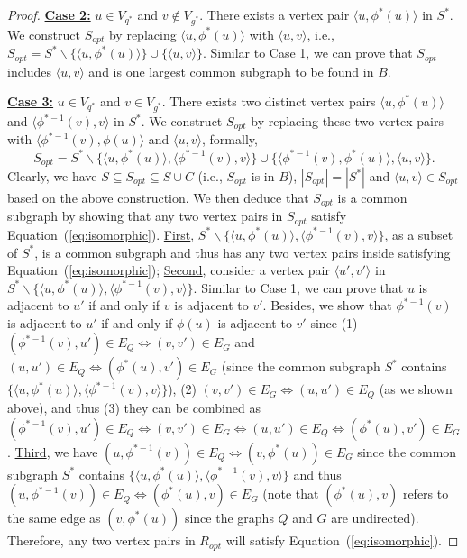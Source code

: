 \begin{proof}
    \smallskip
    \noindent\underline{\textbf{Case 2:}} $u\in V_{q^*}$ and $v\notin V_{g^*}$. There exists a vertex pair $\langle u,\phi^*(u) \rangle$ in $S^*$. We construct $S_{opt}$ by replacing $\langle u,\phi^*(u) \rangle$ with $\langle u,v \rangle$, i.e., $S_{opt}=S^*\backslash \{\langle u,\phi^*(u) \rangle\}\cup\{\langle u,v \rangle\}$. Similar to Case 1, we can prove that $S_{opt}$ includes $\langle u,v \rangle$ and is one largest common subgraph to be found in $B$. 

    \smallskip
    \noindent\underline{\textbf{Case 3:}} $u\in V_{q^*}$ and $v\in V_{g^*}$. There exists two distinct vertex pairs $\langle u,\phi^*(u) \rangle$ and $\langle \phi^{*-1}(v),v \rangle$ in $S^*$. We construct $S_{opt}$ by replacing these two vertex pairs with $\langle \phi^{*-1}(v),\phi(u) \rangle$ and $\langle u,v \rangle$, formally,
    \begin{equation}
        S_{opt}\!\!=\!\!S^*\backslash\{\langle u,\phi^*(u) \rangle,\!\langle\phi^{*-1}(v),v \rangle\}\!\cup\!\{\langle \phi^{*-1}(v),\phi^*(u) \rangle,\!\langle u,v \rangle\}.
    \end{equation}
    Clearly, we have $S\subseteq S_{opt}\subseteq S\cup C$ (i.e., $S_{opt}$ is in $B$), $|S_{opt}|=|S^*|$ and $\langle u,v \rangle\in S_{opt}$ based on the above construction. We then deduce that $S_{opt}$ is a common subgraph  by showing that any two vertex pairs in $S_{opt}$ satisfy Equation~(\ref{eq:isomorphic}).
    \underline{First}, $S^*\backslash\{\langle u,\phi^*(u) \rangle,\langle \phi^{*-1}(v),v\rangle\}$, as a subset of $S^*$, is a common subgraph and thus has any two vertex pairs inside satisfying Equation~(\ref{eq:isomorphic});
    \underline{Second}, consider a vertex pair $\langle u',v' \rangle$ in $S^*\backslash\{\langle u,\phi^*(u) \rangle,\langle \phi^{*-1}(v),v\rangle\}$. Similar to Case 1, we can prove that $u$ is adjacent to $u'$ if and only if $v$ is adjacent to $v'$. Besides, we show that $\phi^{*-1}(v)$ is adjacent to $u'$ if and only if $\phi(u)$ is adjacent to $v'$ since (1) $(\phi^{*-1}(v),u')\in E_Q\Leftrightarrow (v,v')\in E_G$ and $(u,u')\in E_Q\Leftrightarrow (\phi^*(u),v')\in E_G$ (since the common subgraph $S^*$ contains $\{\langle u,\phi^*(u) \rangle,\langle \phi^{*-1}(v),v\rangle\}$), (2) $ (v,v')\in E_G \Leftrightarrow (u,u')\in E_Q$ (as we shown above), and thus (3) they can be combined as $(\phi^{*-1}(v),u')\in E_Q\Leftrightarrow (v,v')\in E_G \Leftrightarrow (u,u')\in E_Q \Leftrightarrow (\phi^*(u),v')\in E_G$.
    \underline{Third}, we have $(u,\phi^{*-1}(v))\in E_Q\Leftrightarrow (v,\phi^*(u))\in E_G$ since the common subgraph $S^*$ contains $\{\langle u,\phi^*(u) \rangle,\langle \phi^{*-1}(v),v\rangle\}$ and thus $(u,\phi^{*-1}(v))\in E_Q\Leftrightarrow (\phi^*(u),v)\in E_G$ (note that $(\phi^*(u),v)$ refers to the same edge as $(v,\phi^*(u))$ since the graphs $Q$ and $G$ are undirected). Therefore, any two vertex pairs in $R_{opt}$ will satisfy Equation~(\ref{eq:isomorphic}).


\end{proof}
